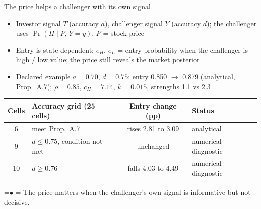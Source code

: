 \documentclass[10pt,aspectratio=169]{beamer}
\newcommand{\Status}[1]{{\color{cGrayText}\scriptsize #1}}
\newcommand{\TakeawayBody}[1]{\begin{minipage}{\textwidth}\raggedright\normalsize
    \setbox0=\hbox{{\usebeamercolor[fg]{structure}\raise0.7pt\hbox{\scriptsize$\bullet$}}\hspace{0.55em}}%
    \hangindent=\wd0 \hangafter=1 \noindent\box0 #1\par
  \end{minipage}}
\renewcommand{\Takeaway}[2][\ExhibitReadingGap]{\par\vspace{#1}\noindent\TakeawayBody{#2}\par}
\newcommand{\NavGap}{\par\vspace{0.45cm}}%
\let\AdapterBackButton\BackButton
\renewcommand{\BackButton}[1]{\NavGap\AdapterBackButton{#1}}%
\begin{document}
\begin{frame}[label=A6]{The price helps a challenger with its own signal}
\hypertarget{app:signals}{}
{\small
\begin{itemize}\setlength{\itemsep}{3pt}
\item Investor signal $T$ (accuracy $a$), challenger signal $Y$ (accuracy $d$); the challenger uses $\Pr(H\mid P,\,Y=y)$, $P$ = stock price
\item Entry is state dependent: $e_H$, $e_L$ = entry probability when the challenger is high / low value; the price still reveals the market posterior
\item Declared example $a=0.70$, %
$d=0.75$: %
entry 0.850 %
$\to$ 0.879 %
\Status{(analytical, Prop.~A.7)}; $\rho=0.85$, %
$c_H=7.14$, %
$k=0.015$, %
strengths 1.1 %
vs 2.3 %
\end{itemize}}
\vspace{2pt}
\begin{center}\small
\begin{tabular}{@{}clcl@{}}
\toprule
Cells & Accuracy grid (25 cells) & Entry change (pp) & Status\\
\midrule
6 & meet Prop.~A.7 & rises 2.81 to 3.09 & \Status{analytical}\\
9 & $d\le0.75$, condition not met & unchanged & \Status{numerical diagnostic}\\
10 & $d\ge0.76$ & falls 4.03 to 4.49 & \Status{numerical diagnostic}\\
\bottomrule
\end{tabular}
\end{center}
\Takeaway{The price matters when the challenger's own signal is informative but not decisive.}
\end{frame}
\end{document}
